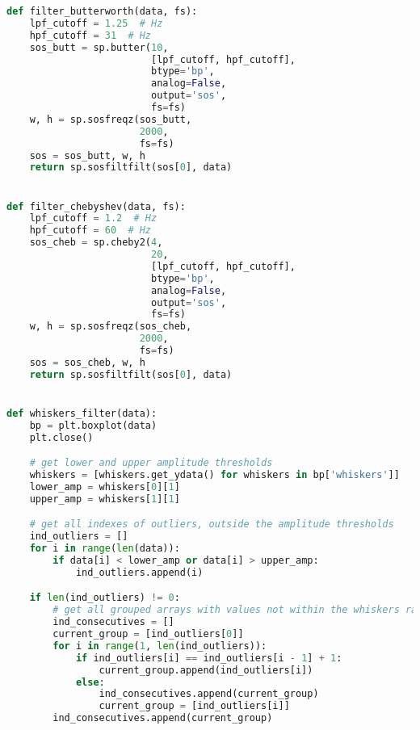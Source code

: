 \begin{lstlisting}[language=Python,label={lst:filters.py}, basicstyle=\scriptsize]
def filter_butterworth(data, fs):
    lpf_cutoff = 1.25  # Hz
    hpf_cutoff = 31  # Hz
    sos_butt = sp.butter(10,
                         [lpf_cutoff, hpf_cutoff],
                         btype='bp',
                         analog=False,
                         output='sos',
                         fs=fs)
    w, h = sp.sosfreqz(sos_butt,
                       2000,
                       fs=fs)
    sos = sos_butt, w, h
    return sp.sosfiltfilt(sos[0], data)


def filter_chebyshev(data, fs):
    lpf_cutoff = 1.2  # Hz
    hpf_cutoff = 60  # Hz
    sos_cheb = sp.cheby2(4,
                         20,
                         [lpf_cutoff, hpf_cutoff],
                         btype='bp',
                         analog=False,
                         output='sos',
                         fs=fs)
    w, h = sp.sosfreqz(sos_cheb,
                       2000,
                       fs=fs)
    sos = sos_cheb, w, h
    return sp.sosfiltfilt(sos[0], data)


def whiskers_filter(data):
    bp = plt.boxplot(data)
    plt.close()

    # get lower and upper amplitude thresholds
    whiskers = [whiskers.get_ydata() for whiskers in bp['whiskers']]
    lower_amp = whiskers[0][1]
    upper_amp = whiskers[1][1]

    # get all indexes of outliers, outside the amplitude thresholds
    ind_outliers = []
    for i in range(len(data)):
        if data[i] < lower_amp or data[i] > upper_amp:
            ind_outliers.append(i)

    if len(ind_outliers) != 0:
        # get all grouped arrays with values not within the whiskers range
        ind_consecutives = []
        current_group = [ind_outliers[0]]
        for i in range(1, len(ind_outliers)):
            if ind_outliers[i] == ind_outliers[i - 1] + 1:
                current_group.append(ind_outliers[i])
            else:
                ind_consecutives.append(current_group)
                current_group = [ind_outliers[i]]
        ind_consecutives.append(current_group)


\end{lstlisting}
